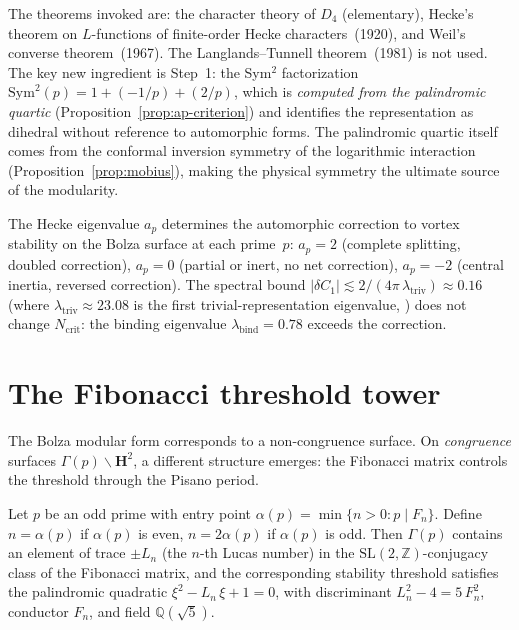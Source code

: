 \noindent
The theorems invoked are: the character theory of $D_4$
(elementary), Hecke's theorem on $L$-functions of
finite-order Hecke characters~(1920), and Weil's converse
theorem~(1967).
The Langlands--Tunnell theorem~(1981) is not used.
The key new ingredient is Step~1: the Sym$^2$ factorization
$\mathrm{Sym}^2(p) = 1 + (-1/p) + (2/p)$, which is
\emph{computed from the palindromic quartic}
(Proposition~\ref{prop:ap-criterion}) and identifies the
representation as dihedral without reference to automorphic
forms.
The palindromic quartic itself comes from the conformal
inversion symmetry of the logarithmic interaction
(Proposition~\ref{prop:mobius}), making the physical
symmetry the ultimate source of the modularity.

\begin{remark}
\label{rmk:bolza-physics}
The Hecke eigenvalue $a_p$ determines the automorphic correction
to vortex stability on the Bolza surface at each prime~$p$:
$a_p = 2$ (complete splitting, doubled correction),
$a_p = 0$ (partial or inert, no net correction),
$a_p = -2$ (central inertia, reversed correction).
The spectral bound
$|\delta C_1| \lesssim 2/(4\pi\,\lambda_{\mathrm{triv}})
\approx 0.16$ (where $\lambda_{\mathrm{triv}} \approx 23.08$
is the first trivial-representation eigenvalue,
\citealt{Strohmaier2013}) does not change $N_{\mathrm{crit}}$:
the binding eigenvalue $\lambda_{\mathrm{bind}} = 0.78$
exceeds the correction.
\end{remark}

\section{The Fibonacci threshold tower}

The Bolza modular form corresponds to a non-congruence surface.
On \emph{congruence} surfaces $\Gamma(p)\backslash\mathbf{H}^2$,
a different structure emerges: the Fibonacci matrix controls the
threshold through the Pisano period.

\begin{theorem}
\label{thm:fibonacci-systole}
Let $p$ be an odd prime with entry point
$\alpha(p) = \min\{n > 0 : p \mid F_n\}$.
Define $n = \alpha(p)$ if $\alpha(p)$ is even,
$n = 2\alpha(p)$ if $\alpha(p)$ is odd.
Then $\Gamma(p)$ contains an element of trace $\pm L_n$
(the $n$-th Lucas number) in the
$\mathrm{SL}(2,\mathbb{Z})$-conjugacy class of the
Fibonacci matrix, and the corresponding stability threshold
satisfies the palindromic quadratic
$\xi^2 - L_n\,\xi + 1 = 0$,
with discriminant $L_n^2 - 4 = 5\,F_n^2$,
conductor $F_n$, and field $\mathbb{Q}(\sqrt{5})$.
\end{theorem}

